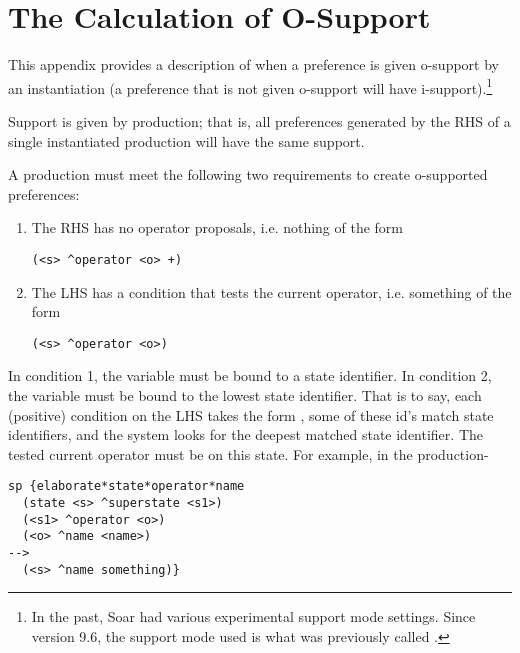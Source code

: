 \chapter{The Calculation of O-Support}
\label{SUPPORT}

This appendix provides a description of when a preference is given o-support by an instantiation (a preference that is not given o-support will have i-support).\footnote{In the past, Soar had various experimental support mode settings. Since version 9.6, the support mode used is what was previously called . }

Support is given by production; that is, all preferences generated by the RHS of a single instantiated production will have the same support. 

A production must meet the following two requirements to create o-supported preferences:
\begin{enumerate}
\item The RHS has no operator proposals, i.e. nothing of the form \begin{verbatim}(<s> ^operator <o> +) \end{verbatim}
\item The LHS has a condition that tests the current operator, i.e. something of the form
\begin{verbatim}(<s> ^operator <o>)\end{verbatim}
\end{enumerate}

In condition 1, the variable  must be bound to a state identifier.
In condition 2, the variable  must be bound to the lowest state identifier. That is to say, each (positive) condition on the LHS takes the form , some of these id's match state identifiers, and the system looks for the deepest matched state identifier. The tested current operator must be on this state. For example, in the production-

\begin{verbatim}
sp {elaborate*state*operator*name
  (state <s> ^superstate <s1>)
  (<s1> ^operator <o>)
  (<o> ^name <name>)
-->
  (<s> ^name something)}
\end{verbatim}


